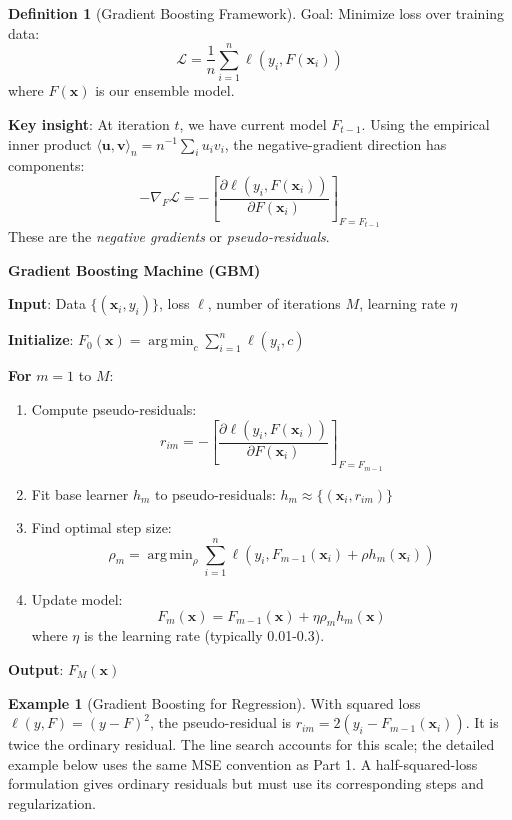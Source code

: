 \documentclass[11pt,twoside]{article}
\numberwithin{equation}{section}
\DeclareMathOperator*{\argmin}{arg\,min}
\newcommand{\vect}[1]{\bm{#1}}
\newcommand{\pp}[2]{\frac{\partial #1}{\partial #2}}
\newcommand{\Loss}{\mathcal{L}}
\theoremstyle{plain}
\theoremstyle{definition}
\newtheorem{definition}[theorem]{Definition}
\newtheorem{example}[theorem]{Example}
\theoremstyle{remark}
\begin{document}
\begin{definition}[Gradient Boosting Framework]
Goal: Minimize loss over training data:
\[
\Loss = \frac1n\sum_{i=1}^n \ell(y_i, F(\vect{x}_i))
\]
where $F(\vect{x})$ is our ensemble model.

\textbf{Key insight}: At iteration $t$, we have current model $F_{t-1}$. Using the empirical inner product $\langle\vect u,\vect v\rangle_n=n^{-1}\sum_i u_iv_i$, the negative-gradient direction has components:
\[
-\nabla_F \Loss = -\left[\pp{\ell(y_i, F(\vect{x}_i))}{F(\vect{x}_i)}\right]_{F=F_{t-1}}
\]
These are the \emph{negative gradients} or \emph{pseudo-residuals}.
\end{definition}

\begin{algorithmbox}
\textbf{Gradient Boosting Machine (GBM)}

\textbf{Input}: Data $\{(\vect{x}_i, y_i)\}$, loss $\ell$, number of iterations $M$, learning rate $\eta$

\textbf{Initialize}: $F_0(\vect{x}) = \argmin_c \sum_{i=1}^n \ell(y_i, c)$

\textbf{For} $m = 1$ to $M$:
\begin{enumerate}
\item Compute pseudo-residuals:
\[
r_{im} = -\left[\pp{\ell(y_i, F(\vect{x}_i))}{F(\vect{x}_i)}\right]_{F=F_{m-1}}
\]

\item Fit base learner $h_m$ to pseudo-residuals: $h_m \approx \{(\vect{x}_i, r_{im})\}$

\item Find optimal step size:
\[
\rho_m = \argmin_\rho \sum_{i=1}^n \ell(y_i, F_{m-1}(\vect{x}_i) + \rho h_m(\vect{x}_i))
\]

\item Update model:
\[
F_m(\vect{x}) = F_{m-1}(\vect{x}) + \eta \rho_m h_m(\vect{x})
\]
where $\eta$ is the learning rate (typically 0.01-0.3).
\end{enumerate}

\textbf{Output}: $F_M(\vect{x})$
\end{algorithmbox}

\begin{example}[Gradient Boosting for Regression]
With squared loss $\ell(y,F)=(y-F)^2$, the pseudo-residual is $r_{im}=2(y_i-F_{m-1}(\vect x_i))$. It is twice the ordinary residual. The line search accounts for this scale; the detailed example below uses the same MSE convention as Part 1. A half-squared-loss formulation gives ordinary residuals but must use its corresponding steps and regularization.
\end{example}
\end{document}
